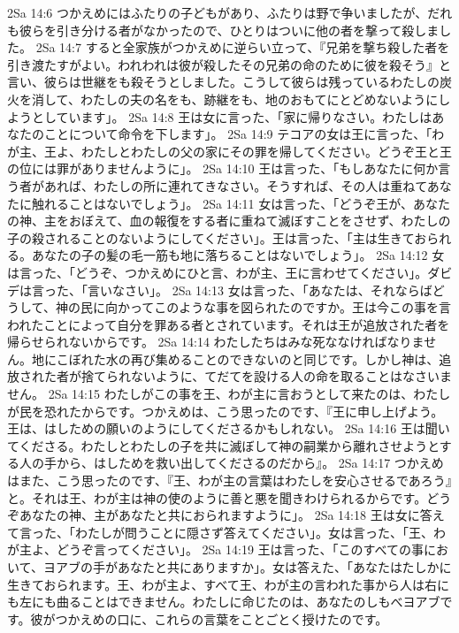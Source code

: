 2Sa 14:6  つかえめにはふたりの子どもがあり、ふたりは野で争いましたが、だれも彼らを引き分ける者がなかったので、ひとりはついに他の者を撃って殺しました。
2Sa 14:7  すると全家族がつかえめに逆らい立って、『兄弟を撃ち殺した者を引き渡たすがよい。われわれは彼が殺したその兄弟の命のために彼を殺そう』と言い、彼らは世継をも殺そうとしました。こうして彼らは残っているわたしの炭火を消して、わたしの夫の名をも、跡継をも、地のおもてにとどめないようにしようとしています」。
2Sa 14:8  王は女に言った、「家に帰りなさい。わたしはあなたのことについて命令を下します」。
2Sa 14:9  テコアの女は王に言った、「わが主、王よ、わたしとわたしの父の家にその罪を帰してください。どうぞ王と王の位には罪がありませんように」。
2Sa 14:10  王は言った、「もしあなたに何か言う者があれば、わたしの所に連れてきなさい。そうすれば、その人は重ねてあなたに触れることはないでしょう」。
2Sa 14:11  女は言った、「どうぞ王が、あなたの神、主をおぼえて、血の報復をする者に重ねて滅ぼすことをさせず、わたしの子の殺されることのないようにしてください」。王は言った、「主は生きておられる。あなたの子の髪の毛一筋も地に落ちることはないでしょう」。
2Sa 14:12  女は言った、「どうぞ、つかえめにひと言、わが主、王に言わせてください」。ダビデは言った、「言いなさい」。
2Sa 14:13  女は言った、「あなたは、それならばどうして、神の民に向かってこのような事を図られたのですか。王は今この事を言われたことによって自分を罪ある者とされています。それは王が追放された者を帰らせられないからです。
2Sa 14:14  わたしたちはみな死ななければなりません。地にこぼれた水の再び集めることのできないのと同じです。しかし神は、追放された者が捨てられないように、てだてを設ける人の命を取ることはなさいません。
2Sa 14:15  わたしがこの事を王、わが主に言おうとして来たのは、わたしが民を恐れたからです。つかえめは、こう思ったのです、『王に申し上げよう。王は、はしための願いのようにしてくださるかもしれない。
2Sa 14:16  王は聞いてくださる。わたしとわたしの子を共に滅ぼして神の嗣業から離れさせようとする人の手から、はしためを救い出してくださるのだから』。
2Sa 14:17  つかえめはまた、こう思ったのです、『王、わが主の言葉はわたしを安心させるであろう』と。それは王、わが主は神の使のように善と悪を聞きわけられるからです。どうぞあなたの神、主があなたと共におられますように」。
2Sa 14:18  王は女に答えて言った、「わたしが問うことに隠さず答えてください」。女は言った、「王、わが主よ、どうぞ言ってください」。
2Sa 14:19  王は言った、「このすべての事において、ヨアブの手があなたと共にありますか」。女は答えた、「あなたはたしかに生きておられます。王、わが主よ、すべて王、わが主の言われた事から人は右にも左にも曲ることはできません。わたしに命じたのは、あなたのしもべヨアブです。彼がつかえめの口に、これらの言葉をことごとく授けたのです。
